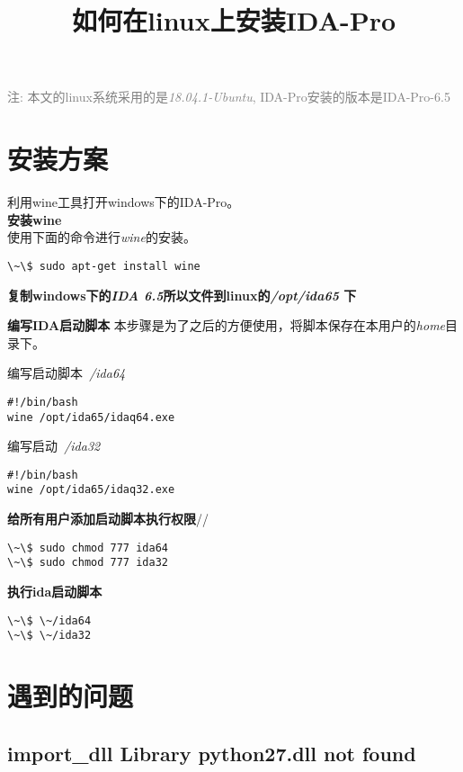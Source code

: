 \documentclass{article}
\title{如何在linux上安装IDA-Pro}
\begin{document}
\maketitle

\textcolor{gray}{注: 本文的linux系统采用的是\textit{18.04.1-Ubuntu}, IDA-Pro安装的版本是IDA-Pro-6.5}


\section{安装方案}
利用wine工具打开windows下的IDA-Pro。\\

\textbf{安装wine} \\
使用下面的命令进行\textit{wine}的安装。

\begin{lstlisting}
\~\$ sudo apt-get install wine
\end{lstlisting}

\textbf{复制windows下的\textit{IDA 6.5}所以文件到linux的\textit{/opt/ida65} 下}

\textbf{编写IDA启动脚本}
本步骤是为了之后的方便使用，将脚本保存在本用户的\textit{home}目录下。

编写启动脚本\textit{~/ida64}
\begin{lstlisting}
#!/bin/bash
wine /opt/ida65/idaq64.exe

\end{lstlisting}

编写启动\textit{~/ida32}
\begin{lstlisting}
#!/bin/bash
wine /opt/ida65/idaq32.exe
\end{lstlisting}

\textbf{给所有用户添加启动脚本执行权限}//
\begin{lstlisting}
\~\$ sudo chmod 777 ida64 
\~\$ sudo chmod 777 ida32 
\end{lstlisting}

\textbf{执行ida启动脚本}\\
\begin{lstlisting}
\~\$ \~/ida64
\~\$ \~/ida32
\end{lstlisting}

\section{遇到的问题}

\subsection{import\_dll Library python27.dll not found
}
\end{document}
